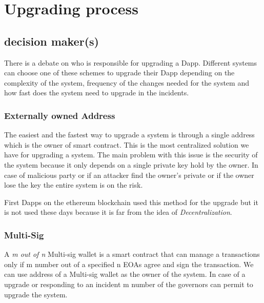 

 \section{Upgrading process}
  

 \subsection{decision maker(s)} \label{decisionMakers}
 There is a debate on who is responsible for upgrading a Dapp. Different systems can choose one of these schemes to upgrade their Dapp depending on the complexity of the system, frequency of the changes needed for the system and how fast does the system need to upgrade in the incidents.
 \subsubsection{Externally owned Address}
The easiest and the fastest way to upgrade a system is through a single address which is the owner of smart contract. This is the most centralized solution we have for upgrading a system. The main problem with this issue is the security of the system because it only depends on a single private key hold by the owner. In case of malicious party or if an attacker find the owner's private or if the owner lose the key the entire system is on the risk.

First Dapps on the ethereum blockchain used this method for the upgrade but it is not used these days because it is far from the idea of \textit{Decentralization}. 

 \subsubsection{Multi-Sig}
 A \textit{m out of n} Multi-sig wallet is a smart contract that can manage a transactions only if m number out of a specified n EOAs agree and sign the transaction. We can use address of a Multi-sig wallet as the owner of the system. In case of a upgrade or responding to an incident m number of the governors can permit to upgrade the system.


